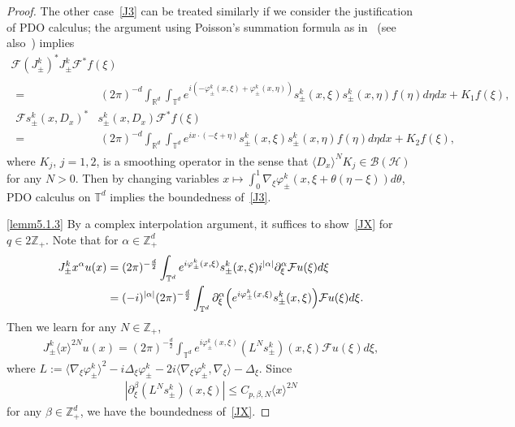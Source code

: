 \documentclass[AHL,Unicode,longabstracts,published]{cedram}
\renewcommand{\a}{\alpha}
\renewcommand{\b}{\beta}
\newcommand{\f}{\varphi}
\newcommand{\x}{\xi}
\newcommand{\R}{\mathbb{R}}
\newcommand{\Z}{\mathbb{Z}}
\newcommand{\T}{\mathbb{T}}
\newcommand{\HS}{\mathcal{H}}
\newcommand{\FS}{\mathcal{F}}
\newcommand{\BS}{\mathcal{B}}
\newcommand{\jap}[1]{\langle #1 \rangle}
\newcommand{\Z}{\mathbb{Z}}
\newcommand{\R}{\mathbb{R}}
\newcommand{\HS}{\mathcal{H}}
\begin{document}
\begin{proof}
The other case~\eqref{J3} can be treated similarly if we consider the justification of PDO calculus; the argument using Poisson's summation formula as in~\cite[Lemma~7.1]{N3} (see also~\cite[Lemma~2.3]{T1}) implies
\begin{multline*}
\FS \left(J_\pm^k\right)^* J_\pm^k \FS^* f(\x) \\
\begin{aligned}
=&\,(2\pi)^{-d} \int_{\R^d} \int_{\T^d} e^{i\left(-\f_{\pm}^k(x,\x)+\f_{\pm}^k(x,\eta)\right)} s_\pm^k(x,\x) s_\pm^k(x,\eta) f(\eta) d\eta dx + K_1 f(\x), \\
\FS s_\pm^k(x,D_x)^* & s_\pm^k(x,D_x) \FS^* f(\x) \\
=&\,(2\pi)^{-d} \int_{\R^d} \int_{\T^d} e^{i x\cdot(-\x+\eta)} s_\pm^k(x,\x) s_\pm^k(x,\eta) f(\eta) d\eta dx + K_2 f(\x),
\end{aligned}
\end{multline*}
where $K_j$, $j=1,2$, is a smoothing operator in the sense that $\jap{D_x}^N K_j \in \BS(\HS)$ for any $N>0$. Then by changing variables $x\mapsto \int_0^1 \nabla_\x\f_\pm^k(x,\x+\theta(\eta-\x))d\theta$, PDO calculus on $\T^d$ implies the boundedness of~\eqref{J3}.

\eqref{lemm5.1.3} By a complex interpolation argument, it suffices to show~\eqref{JX} for $q\in 2\Z_+$. Note that for $\a\in\Z_+^d$
\begin{align*}
 J_\pm^k x^\a u(x) 
&= (2\pi)^{-\frac{d}{2}} \int_{\T^d} e^{i\f_{\pm}^k(x,\x)}s_\pm^k(x,\x) i^{|\a|}\partial_{\x}^\a \FS u(\x) d\x \\
&= (-i)^{|\a|} (2\pi)^{-\frac{d}{2}} \int_{\T^d} \partial_{\x}^\a \Bigl(e^{i\f_{\pm}^k(x,\x)} s_\pm^k(x,\x) \Bigr) \FS u(\x) d\x. 
\end{align*}
Then we learn for any $N\in\Z_+$,
\begin{align*}
J_\pm^k \jap{x}^{2N} u(x) = (2\pi)^{-\frac{d}{2}} \int_{\T^d} e^{i\f_{\pm}^k(x,\x)} \left(L^{N}s_\pm^k\right)(x,\x) \FS u(\x) d\x,
\end{align*}
where $L := \jap{\nabla_\x\f_\pm^k}^2 - i\Delta_\x\f_\pm^k - 2i\jap{\nabla_\x\f_\pm^k,\nabla_\x} - \Delta_\x$. Since
\begin{align*}
\left|\partial_\x^\b\left(L^{N}s_\pm^k\right)(x,\x)\right| \leq C_{p,\b,N} \jap{x}^{2N}
\end{align*}
for any $\b\in\Z_+^d$, we have the boundedness of~\eqref{JX}.




\end{proof}
\end{document}
